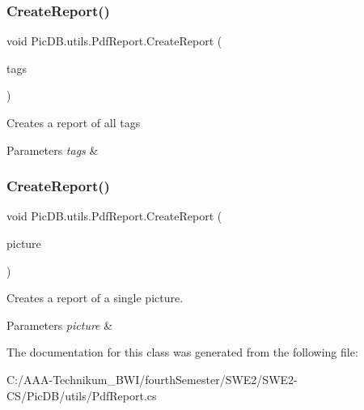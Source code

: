 \subsubsection{\texorpdfstring{Create\+Report()}{CreateReport()}\hspace{0.1cm}{\footnotesize\ttfamily [1/2]}}
{\footnotesize\ttfamily void Pic\+D\+B.\+utils.\+Pdf\+Report.\+Create\+Report (\begin{DoxyParamCaption}\item[{string}]{tags }\end{DoxyParamCaption})}



Creates a report of all tags 


\begin{DoxyParams}{Parameters}
{\em tags} & \\
\hline
\end{DoxyParams}
\mbox{\label{class_pic_d_b_1_1utils_1_1_pdf_report_aa4a4b1df10c17c5ad56028419f37d389}} 
\subsubsection{\texorpdfstring{Create\+Report()}{CreateReport()}\hspace{0.1cm}{\footnotesize\ttfamily [2/2]}}
{\footnotesize\ttfamily void Pic\+D\+B.\+utils.\+Pdf\+Report.\+Create\+Report (\begin{DoxyParamCaption}\item[{I\+Picture\+View\+Model}]{picture }\end{DoxyParamCaption})}



Creates a report of a single picture. 


\begin{DoxyParams}{Parameters}
{\em picture} & \\
\hline
\end{DoxyParams}


The documentation for this class was generated from the following file\+:\begin{DoxyCompactItemize}
\item 
C\+:/\+A\+A\+A-\/\+Technikum\+\_\+\+B\+W\+I/fourth\+Semester/\+S\+W\+E2/\+S\+W\+E2-\/\+C\+S/\+Pic\+D\+B/utils/Pdf\+Report.\+cs\end{DoxyCompactItemize}
